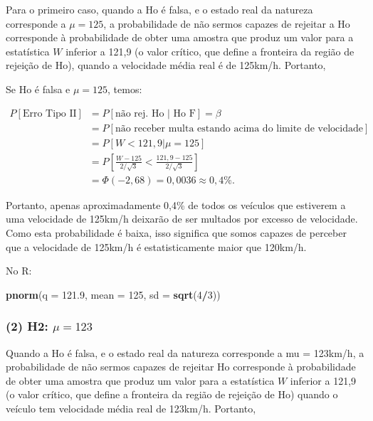 \documentclass[
]{book}
\newenvironment{Shaded}{\begin{snugshade}}{\end{snugshade}}
\newcommand{\DataTypeTok}[1]{\textcolor[rgb]{0.13,0.29,0.53}{#1}}
\newcommand{\DecValTok}[1]{\textcolor[rgb]{0.00,0.00,0.81}{#1}}
\newcommand{\FloatTok}[1]{\textcolor[rgb]{0.00,0.00,0.81}{#1}}
\newcommand{\KeywordTok}[1]{\textcolor[rgb]{0.13,0.29,0.53}{\textbf{#1}}}
\newcommand{\NormalTok}[1]{#1}
\newcommand{\OperatorTok}[1]{\textcolor[rgb]{0.81,0.36,0.00}{\textbf{#1}}}
\theoremstyle{definition}
\theoremstyle{definition}
\theoremstyle{definition}
\theoremstyle{remark}
\begin{document}
Para o primeiro caso, quando a Ho é falsa, e o estado real da natureza corresponde a \(\mu = 125\), a probabilidade de não sermos capazes de rejeitar a Ho corresponde à probabilidade de obter uma amostra que produz um valor para a estatística \(W\) inferior a 121,9 (o valor crítico, que define a fronteira da região de rejeição de Ho), quando a velocidade média real é de 125km/h. Portanto,

Se Ho é falsa e \(\mu = 125\), temos:

\begin{align*}
P[\text{Erro Tipo II}] 
&= P [\text{não rej. Ho | Ho F}] = \beta\\
&= P [\text{não receber multa estando acima do limite de velocidade}]\\
&= P [W < 121,9 | \mu= 125]\\
&= P \left[\frac{W - 125}{2/\sqrt{3}} < \frac{121,9 - 125}{2/\sqrt{3}} \right]\\   
&= \Phi (-2,68) = 0,0036 \approx 0,4\%.  
\end{align*}

Portanto, apenas aproximadamente 0,4\% de todos os veículos que estiverem a uma velocidade de 125km/h deixarão de ser multados por excesso de velocidade. Como esta probabilidade é baixa, isso significa que somos capazes de perceber que a velocidade de 125km/h é estatisticamente maior que 120km/h.

No R:

\begin{Shaded}
\begin{Highlighting}[]
\KeywordTok{pnorm}\NormalTok{(}\DataTypeTok{q =} \FloatTok{121.9}\NormalTok{, }\DataTypeTok{mean =} \DecValTok{125}\NormalTok{, }\DataTypeTok{sd =} \KeywordTok{sqrt}\NormalTok{(}\DecValTok{4}\OperatorTok{/}\DecValTok{3}\NormalTok{))}
\end{Highlighting}
\end{Shaded}

\hypertarget{h2-mu-123}{%
\subsubsection*{\texorpdfstring{(2) H2: \(\mu = 123\)}{(2) H2: \textbackslash mu = 123}}\label{h2-mu-123}}

Quando a Ho é falsa, e o estado real da natureza corresponde a mu = 123km/h, a probabilidade de não sermos capazes de rejeitar Ho corresponde à probabilidade de obter uma amostra que produz um valor para a estatística \(W\) inferior a 121,9 (o valor crítico, que define a fronteira da região de rejeição de Ho) quando o veículo tem velocidade média real de 123km/h. Portanto,
\end{document}
